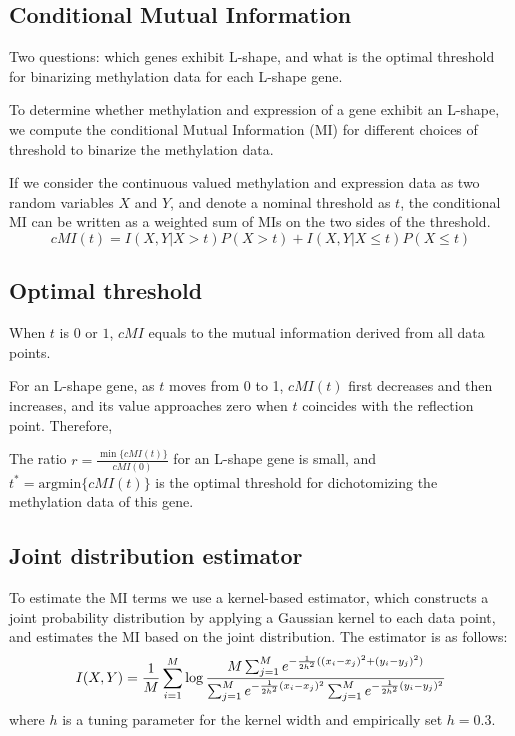 \documentclass[a4paper,10pt]{article}
\begin{document}

\subsection{Conditional Mutual Information}
Two questions: which genes exhibit
L-shape, and what is the optimal threshold for binarizing
methylation data for each L-shape gene.

\medskip
To determine whether methylation and expression of a gene exhibit an L-shape,
we compute the conditional Mutual Information (MI) for different choices of threshold
to binarize the methylation data.


\medskip
If we consider the continuous valued methylation and expression data as two random variables
$X$ and $Y$, and denote a nominal threshold as $t$, the conditional MI can be written as a
weighted sum of MIs on the two sides of the threshold.
\[
\mathit{cMI}(t)=I(X,Y|X>t)P(X>t) + I(X,Y|X\le t)P(X\le t)
\]

\subsection{Optimal threshold}

When $t$ is $0$ or $1$, $\mathit{cMI}$ equals to the mutual information derived 
from all data points.

For an L-shape gene, as $t$ moves from 0 to 1, $\mathit{cMI}(t)$ first decreases and then
increases, and its value approaches zero when $t$ coincides with the reflection point. 
Therefore,

\medskip

The ratio $r=\frac{\min\{\mathit{cMI}(t)\}}{\mathit{cMI}(0)}$ for an L-shape gene is small, 
and $t^{\ast} = \mathrm{argmin}\{ \mathit{cMI}(t) \}$ is the optimal threshold for 
dichotomizing the methylation data of this gene.

\subsection{Joint distribution estimator}
To estimate the MI terms we use a kernel-based estimator, which constructs a joint
probability distribution by applying a Gaussian kernel to each data point, and estimates
the MI based on the joint distribution. The estimator is as follows:
\[
I(X,Y) = \frac 1M \sum_{i=1}^M \log\frac{M\sum_{j=1}^M e^{-\frac{1}{2h^2}((x_i-x_j)^2+(y_i-y_j)^2)}}{%
                                      \sum_{j=1}^M e^{-\frac{1}{2h^2}(x_i-x_j)^2} \sum_{j=1}^M e^{-\frac{1}{2h^2}(y_i-y_j)^2}}
\]
where $h$ is a tuning parameter for the kernel width and empirically set $h=0.3$.
\end{document}
